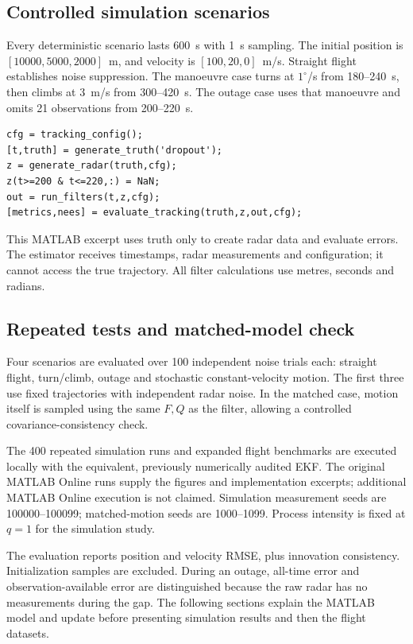 \documentclass[12pt,a4paper]{article}
\begin{document}
\subsection{Controlled simulation scenarios}
Every deterministic scenario lasts 600~s with 1~s sampling. The initial position is $[10000,5000,2000]$~m, and velocity is $[100,20,0]$~m/s. Straight flight establishes noise suppression. The manoeuvre case turns at $1^\circ$/s from 180--240~s, then climbs at 3~m/s from 300--420~s. The outage case uses that manoeuvre and omits 21 observations from 200--220~s.
\begin{lstlisting}
cfg = tracking_config();
[t,truth] = generate_truth('dropout');
z = generate_radar(truth,cfg);
z(t>=200 & t<=220,:) = NaN;
out = run_filters(t,z,cfg);
[metrics,nees] = evaluate_tracking(truth,z,out,cfg);
\end{lstlisting}
This MATLAB excerpt uses truth only to create radar data and evaluate errors. The estimator receives timestamps, radar measurements and configuration; it cannot access the true trajectory. All filter calculations use metres, seconds and radians.

\subsection{Repeated tests and matched-model check}
Four scenarios are evaluated over 100 independent noise trials each: straight flight, turn/climb, outage and stochastic constant-velocity motion. The first three use fixed trajectories with independent radar noise. In the matched case, motion itself is sampled using the same $F,Q$ as the filter, allowing a controlled covariance-consistency check.

The 400 repeated simulation runs and expanded flight benchmarks are executed locally with the equivalent, previously numerically audited EKF. The original MATLAB Online runs supply the figures and implementation excerpts; additional MATLAB Online execution is not claimed. Simulation measurement seeds are 100000--100099; matched-motion seeds are 1000--1099. Process intensity is fixed at $q=1$ for the simulation study.

The evaluation reports position and velocity RMSE, plus innovation consistency. Initialization samples are excluded. During an outage, all-time error and observation-available error are distinguished because the raw radar has no measurements during the gap. The following sections explain the MATLAB model and update before presenting simulation results and then the flight datasets.
\clearpage
\end{document}
